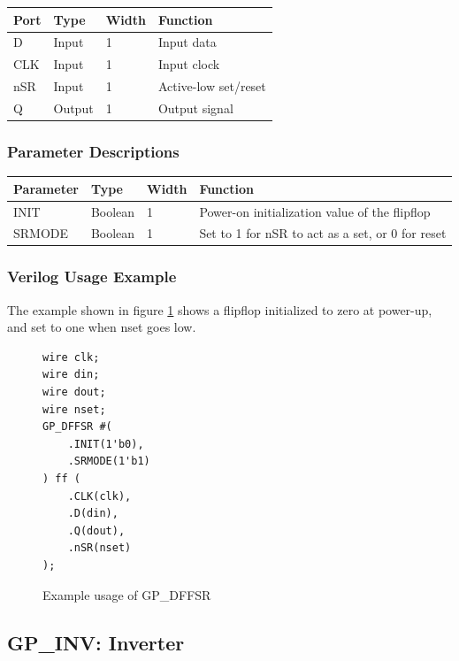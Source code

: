 \documentclass{article}
\begin{document}
\begin{tabularx}{4in}{|l|l|l|X|}
\hline
{\bfseries Port} & {\bfseries Type} & {\bfseries Width} & {\bfseries Function} \\
\hline
D & Input & 1 & Input data \\
\hline
CLK & Input & 1 & Input clock \\
\hline
nSR & Input & 1 & Active-low set/reset \\
\hline
Q & Output & 1 & Output signal \\
\hline
\end{tabularx}

\subsubsection{Parameter Descriptions}

\begin{tabularx}{5in}{|l|l|l|X|}
\hline
{\bfseries Parameter} & {\bfseries Type} & {\bfseries Width} & {\bfseries Function} \\
\hline
INIT & Boolean & 1 & Power-on initialization value of the flipflop \\
\hline
SRMODE & Boolean & 1 & Set to 1 for nSR to act as a set, or 0 for reset \\
\hline
\end{tabularx}

\subsubsection{Verilog Usage Example}

The example shown in figure \ref{gp-dffsr-example} shows a flipflop initialized to zero at power-up, and set to one
when nset goes low.

\begin{figure}[h]
\begin{lstlisting}
wire clk;
wire din;
wire dout;
wire nset;
GP_DFFSR #(
	.INIT(1'b0),
	.SRMODE(1'b1)
) ff (
	.CLK(clk),
	.D(din),
	.Q(dout),
	.nSR(nset)
);
\end{lstlisting}
\caption{Example usage of GP\_DFFSR}
\label{gp-dffsr-example}
\end{figure}


\pagebreak
\subsection{GP\_INV: Inverter}
\end{document}
